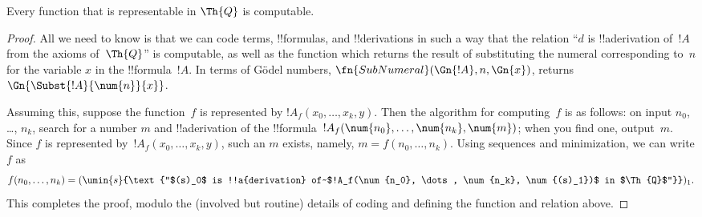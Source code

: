 \documentclass[../../../include/open-logic-section]{subfiles}
\begin{document}

\begin{lem}
Every function that is representable in $\Th{Q}$ is computable.
\end{lem}

\begin{proof}
All we need to know is that we can code terms, !!{formula}s, and
!!{derivation}s in such a way that the relation ``$d$ is
!!a{derivation} of~$!A$ from the axioms of~$\Th{Q}$'' is computable,
as well as the function which returns the result of substituting the
numeral corresponding to~$n$ for the variable $x$ in the
!!{formula}~$!A$. In terms of G\"odel numbers,
$\fn{SubNumeral}(\Gn{!A},n, \Gn{x})$,
returns~$\Gn{\Subst{!A}{\num{n}}{x}}$.

Assuming this, suppose the function~$f$ is represented
by $!A_f(x_0, \dots, x_{k}, y)$. Then the algorithm for computing~$f$
is as follows: on input $n_0$, \dots, $n_{k}$, search for a number $m$
and !!a{derivation} of the !!{formula}~$!A_f(\num{n_0}, \dots, \num{n_k},
\num{m})$; when you find one, output~$m$. Since $f$ is represented
by~$!A_f(x_0, \dots, x_k, y)$, such an $m$ exists, namely, $m = f(n_0,
\dots, n_k)$. Using sequences and minimization, we can write $f$ as
\[
f(n_0,\dots,n_{k}) = (\umin{s}{\text{``$(s)_0$ is !!a{derivation}
    of~$!A_f(\num{n_0}, \dots, \num{n_k}, \num{(s)_1})$ in
    $\Th{Q}$''}})_1.
\]
This completes the proof, modulo the (involved but routine) details of
coding and defining the function and relation above.
\end{proof}
\end{document}
